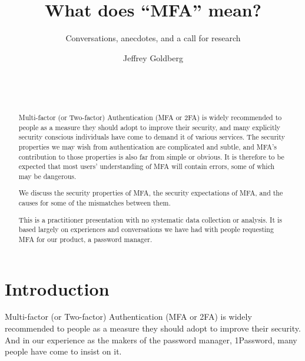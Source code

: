 \documentclass{soups}
\begin{document}
%


\title{What does ``MFA'' mean?}
\subtitle{Conversations, anecdotes, and a call for research}

\author{
  \alignauthor
  Jeffrey Goldberg\\
       \\
       \\
       \\
}


\maketitle
\begin{abstract}

Multi-factor (or Two-factor) Authentication (MFA or 2FA) is widely recommended to people as a measure they should adopt to improve their security,
and many explicitly security conscious individuals have come to demand it of various services.
The security properties we may wish from authentication are complicated and subtle,
and MFA's contribution to those properties is also far from simple or obvious.
It is therefore to be expected that most users' understanding of MFA will contain errors, some of which may be dangerous.

We discuss the security properties of MFA, the security expectations of MFA, and the causes for some of the mismatches between them.

This is a practitioner presentation with no systematic data collection or analysis.
It is based largely on experiences and conversations we have had with people requesting MFA for our product, a password manager.
\end{abstract}


\section{Introduction}
Multi-factor (or Two-factor) Authentication (MFA or 2FA) is widely recommended to people as a measure they should adopt to improve their security. And in our experience as the makers of the password manager, 1Password, many people have come to insist on it.
\end{document}
